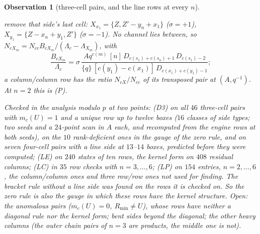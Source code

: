 \documentclass[11pt]{article}
\newtheorem{observation}{Observation}
\newcommand{\Lam}{\Lambda}
\begin{document}
\begin{observation}[three-cell pairs, and the line rows at every $n$]
\begin{itemize}
remove that side's last cell: $X_{x_1}=\{Z,Z'-y_n+x_1\}$ ($\sigma=+1$), $X_{y_1}=\{Z-x_n+y_1,Z'\}$ ($\sigma=-1$).  No
channel lies between, so $N_{cX_m}=N_{cc}B_{cX_m}/(\Lam_c-\Lam_{X_m})$, with
\[
\frac{B_{cX_m}}{\Lam_c}=\sigma\,\frac{Aq^{c(m)}\,[n]\,D_{c(s_1)+c(s_n)+1}\,D_{c(s_1)-2}}{\{q\}\,[c(y_1)-c(x_1)]\,
D_{c(x_1)+c(y_1)-1}};
\]
a column/column row has the ratio $N_{cX}/N_{cc}$ of its transposed pair at $(A,q^{-1})$.  At $n=2$ this is (P).
\end{itemize}
Checked in the analysis modulo $p$ at two points: (D3) on all $46$ three-cell pairs with $m_c(U)=1$ and a unique row up
to twelve boxes ($16$ classes of side types; two seeds and a $24$-point scan in $A$ each, and recomputed from the engine
rows at both seeds), on the $10$ rank-deficient ones in the gauge of
the zero rule, and on seven four-cell pairs with a line side at $13$--$14$ boxes, predicted before they were computed; (LE)
on $240$ states of ten rows, the kernel form on $408$ residual columns; (LC) in $35$ row checks with $n=3,\dots,6$; (LP) on
$154$ entries, $n=2,\dots,6$, the column/column ones and three row/row ones not used for finding.  The bracket rule
without a line side was found on the rows it is checked on.  So the zero rule is also the gauge in which these rows
have the kernel structure.  Open: the anomalous pairs ($m_c(U)=0$, $R_{\min}\ne U$), whose rows have neither a diagonal
rule nor the kernel form; bent sides beyond the diagonal; the other heavy columns (the outer chain pairs of $n=3$ are
products, the middle one is not).
\end{observation}
\end{document}
